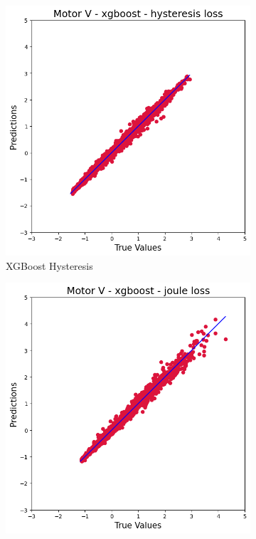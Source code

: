 \documentclass{article}
\begin{document}
\begin{figure}[!htbp]
    \vspace{0.3cm}
    
    \begin{subfigure}[b]{0.23\textwidth}
        \centering
        \includegraphics[width=\textwidth]{images/V/xgboost_hysteresis.png}
        \caption{XGBoost Hysteresis}
    \end{subfigure}
    \hfill
    \begin{subfigure}[b]{0.23\textwidth}
        \centering
        \includegraphics[width=\textwidth]{images/V/xgboost_joule.png}

\end{subfigure}
\end{figure}
\end{document}

